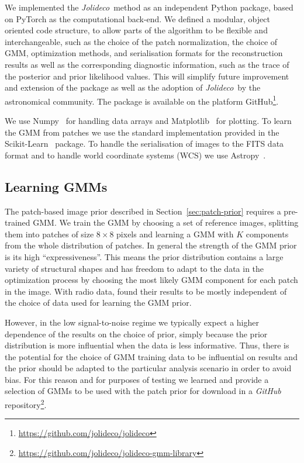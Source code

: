 \documentclass[twocolumn, lineno]{aastex631}
\newcommand{\jolideco}{\textit{Jolideco}~}
\begin{document}
    We implemented the \jolideco method as an independent Python package, based on PyTorch as the computational back-end.  We defined a modular, object oriented code structure, to allow parts of the algorithm to be flexible and interchangeable, such as the choice of the patch normalization, the choice of GMM, optimization methods, and serialisation formats for the reconstruction results as well as the corresponding diagnostic information, such as the trace of the posterior and prior likelihood values. This will simplify future improvement and extension of the package as well as the adoption of \jolideco by the astronomical community. The package is available on the platform GitHub\footnote{\url{https://github.com/jolideco/jolideco}}.

    We use Numpy~\citep{Numpy2020} for handling data arrays and Matplotlib~\citep{Hunter2007} for plotting. To learn the GMM from patches we use the standard implementation provided in the Scikit-Learn~\citep{scikit-learn} package. To handle the serialisation of images to the FITS data format and to handle world coordinate systems (WCS) we use Astropy~\citep{Astropy2018}.

    \subsection{Learning GMMs}
    \label{ssec:jolideco-gmm-library}
    The patch-based image prior described in Section~\ref{sec:patch-prior} requires a pre-trained GMM. We train the GMM by choosing a set of reference images, splitting them into patches of size $8\times8$ pixels and learning a GMM with $K$ components from the whole distribution of patches. In general the strength of the GMM prior is its high \enquote{expressiveness}. This means the prior distribution contains a large variety of structural shapes and has freedom to adapt to the data in the optimization process by choosing the most likely GMM component for each patch in the image. With radio data, \cite{Bouman2016} found their results to be mostly independent of the choice of data used for learning the GMM prior. 
    
    However, in the low signal-to-noise regime we typically expect a higher dependence of the results on the choice of prior, simply because the prior distribution is more influential when the data is less informative. Thus, there is the potential for the choice of GMM training data to be influential on results and the prior should be adapted to the particular analysis scenario in order to avoid bias. For this reason and for purposes of testing we learned and provide a selection of GMMs to be used with the patch prior for download in a \textit{GitHub} repository\footnote{\url{https://github.com/jolideco/jolideco-gmm-library}}. 
    
\end{document}
